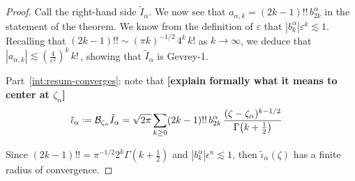 \documentclass[11pt,a4paper,twoside,leqno,noamsfonts]{amsart}
\numberwithin{equation}{section}
\begin{document}
\begin{proof}
Call the right-hand side $\tilde{I}_\alpha$. We now see that $a_{\alpha,k} = (2k-1)!!\,b_{2k}^\alpha$ in the statement of the theorem. We know from the definition of $\varepsilon$ that $\left|b_k^\alpha\right| \varepsilon^k \lesssim 1$. Recalling that $(2k - 1)!! \sim (\pi k)^{-1/2}\,4^k\,k!$ as $k \to \infty$, we deduce that $|a_{\alpha,k}| \lesssim \left(\tfrac{4}{\varepsilon^2}\right)^k\,k!\,$, showing that $\tilde{I}_\alpha$ is Gevrey-1.%



Part~\eqref{int:resum-converges}: note that \textbf{[explain formally what it means to center at $\zeta_\alpha$]}
\begin{align*}
\tilde{\iota}_{\alpha}\defeq \mathcal{B}_{\zeta_\alpha} \tilde{I}_\alpha & = \sqrt{2\pi} \sum_{k \ge 0} (2k-1)!!\,b_{2k}^\alpha\,\frac{(\zeta - \zeta_\alpha)^{k-1/2}}{\Gamma\big(k+\tfrac{1}{2}\big)} 
\end{align*}

Since ${(2k-1)!!}=\pi^{-1/2} 2^k{\Gamma\left(k+\tfrac{1}{2}\right)}$ and $|b_k^\alpha|\epsilon^n\lesssim 1$, then $\tilde{\iota}_{\alpha}(\zeta)$ has a finite radius of convergence. 



\end{proof}
\end{document}
